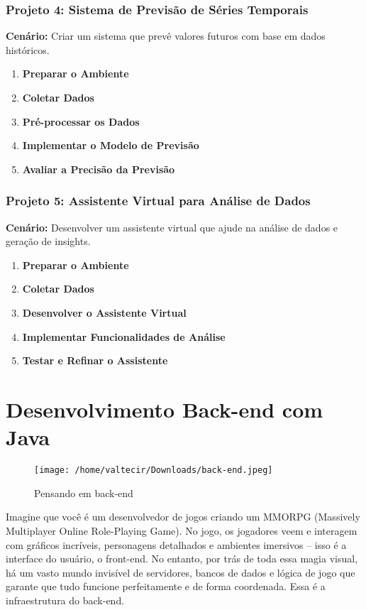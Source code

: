\documentclass[a4paper,12pt]{book}
\begin{document}
\subsection{Projeto 4: Sistema de Previsão de Séries Temporais}
\textbf{Cenário:} Criar um sistema que prevê valores futuros com base em dados históricos.

\begin{enumerate}
  \item \textbf{Preparar o Ambiente}
  \item \textbf{Coletar Dados}
  \item \textbf{Pré-processar os Dados}
  \item \textbf{Implementar o Modelo de Previsão}
  \item \textbf{Avaliar a Precisão da Previsão}
\end{enumerate}

\subsection{Projeto 5: Assistente Virtual para Análise de Dados}
\textbf{Cenário:} Desenvolver um assistente virtual que ajude na análise de dados e geração de insights.

\begin{enumerate}
  \item \textbf{Preparar o Ambiente}
  \item \textbf{Coletar Dados}
  \item \textbf{Desenvolver o Assistente Virtual}
  \item \textbf{Implementar Funcionalidades de Análise}
  \item \textbf{Testar e Refinar o Assistente}
\end{enumerate}

\chapter{Desenvolvimento Back-end com Java}

\begin{figure}[H]
    \centering
    \texttt{[image: /home/valtecir/Downloads/back-end.jpeg]}
    \caption{Pensando em back-end}
    \label{fig:exemplo}
\end{figure}

Imagine que você é um desenvolvedor de jogos criando um MMORPG (Massively Multiplayer Online Role-Playing Game). No jogo, os jogadores veem e interagem com gráficos incríveis, personagens detalhados e ambientes imersivos – isso é a interface do usuário, o front-end. No entanto, por trás de toda essa magia visual, há um vasto mundo invisível de servidores, bancos de dados e lógica de jogo que garante que tudo funcione perfeitamente e de forma coordenada. Essa é a infraestrutura do back-end.
\end{document}
